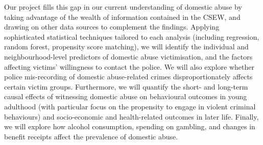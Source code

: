 \documentclass[11pt, a4paper]{article}
\begin{document}


Our project fills this gap in our current understanding of domestic abuse by taking advantage of the wealth of information contained in the CSEW, and drawing on other data sources to complement the findings. Applying sophisticated statistical techniques tailored to each analysis (including regression, random forest, propensity score matching), we will identify the individual and neighbourhood-level predictors of domestic abuse victimisation, and the factors affecting victims' willingness to contact the police. We will also explore whether police mis-recording of domestic abuse-related crimes disproportionately affects certain victim groups. Furthermore, we will quantify the short- and long-term causal effects of witnessing domestic abuse on behavioural outcomes in young adulthood (with particular focus on the propensity to engage in violent criminal behaviours) and socio-economic and health-related outcomes in later life. Finally, we will explore how alcohol consumption, spending on gambling, and changes in benefit receipts affect the prevalence of domestic abuse.
 
\end{document}
